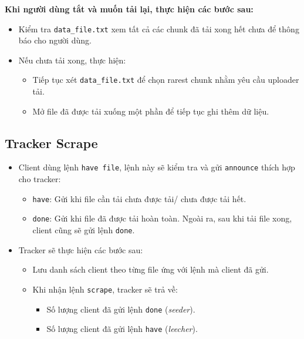 \documentclass[a4paper]{article}
\begin{document}
\textbf{Khi người dùng tắt và muốn tải lại, thực hiện các bước sau:}
\begin{itemize}
    \item Kiểm tra \texttt{data\_file.txt} xem tất cả các chunk đã tải xong hết chưa để thông báo cho người dùng.
    \item Nếu chưa tải xong, thực hiện:
    \begin{itemize}
        \item Tiếp tục xét \texttt{data\_file.txt} để chọn rarest chunk nhằm yêu cầu uploader tải.
        \item Mở file đã được tải xuống một phần để tiếp tục ghi thêm dữ liệu.
    \end{itemize}
\end{itemize}

\subsection{Tracker Scrape}
\begin{itemize}
    \item Client dùng lệnh \texttt{have file}, lệnh này sẽ kiểm tra và gửi \texttt{announce} thích hợp cho tracker:
    \begin{itemize}
        \item \texttt{have}: Gửi khi file cần tải chưa được tải/ chưa được tải hết.
        \item \texttt{done}: Gửi khi file đã được tải hoàn toàn. Ngoài ra, sau khi tải file xong, client cũng sẽ gửi lệnh \texttt{done}.
    \end{itemize}
    \item Tracker sẽ thực hiện các bước sau:
    \begin{itemize}
        \item Lưu danh sách client theo từng file ứng với lệnh mà client đã gửi.
        \item Khi nhận lệnh \texttt{scrape}, tracker sẽ trả về:
        \begin{itemize}
            \item Số lượng client đã gửi lệnh \texttt{done} (\textit{seeder}).
            \item Số lượng client đã gửi lệnh \texttt{have} (\textit{leecher}).
        \end{itemize}
    \end{itemize}
\end{itemize}
\end{document}

